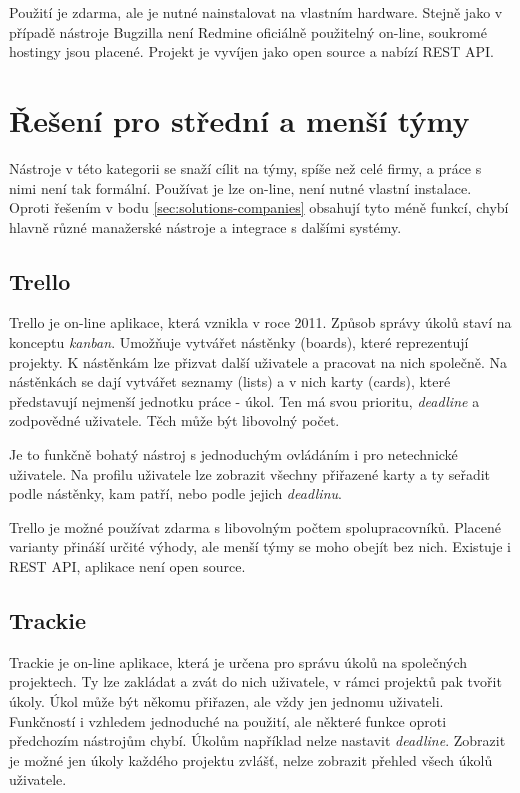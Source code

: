 \documentclass[thesis=B,czech]{FITthesis}[2012/06/26]
\begin{document}
			Použití je zdarma, ale je nutné nainstalovat na vlastním hardware. Stejně jako v případě nástroje Bugzilla není Redmine oficiálně použitelný on-line, soukromé hostingy jsou placené. Projekt je vyvíjen jako open source a nabízí REST API.

	\section{Řešení pro střední a menší týmy}
		\label{sec:solutions-teams}
		Nástroje v této kategorii se snaží cílit na týmy, spíše než celé firmy, a práce s nimi není tak formální. Používat je lze on-line, není nutné vlastní instalace. Oproti řešením v bodu \ref{sec:solutions-companies} obsahují tyto méně funkcí, chybí hlavně různé manažerské nástroje a integrace s dalšími systémy.
	
		\subsection{Trello}
			Trello \cite{trello} je on-line aplikace, která vznikla v roce 2011. Způsob správy úkolů staví na konceptu \textit{kanban}\cite{kanban}. Umožňuje vytvářet nástěnky (boards), které reprezentují projekty. K nástěnkám lze přizvat další uživatele a pracovat na nich společně. Na nástěnkách se dají vytvářet seznamy (lists) a v nich karty (cards), které představují nejmenší jednotku práce - úkol. Ten má svou prioritu, \textit{deadline} a zodpovědné uživatele. Těch může být libovolný počet.
			
			Je to funkčně bohatý nástroj s jednoduchým ovládáním i pro netechnické uživatele. Na profilu uživatele lze zobrazit všechny přiřazené karty a ty seřadit podle nástěnky, kam patří, nebo podle jejich \textit{deadlinu}. 
			
			Trello je možné používat zdarma s libovolným počtem spolupracovníků. Placené varianty přináší určité výhody\cite{trello-pricing}, ale menší týmy se moho obejít bez nich. Existuje i REST API\cite{trello-api}, aplikace není open source.
		
			
		\subsection{Trackie}
			Trackie \cite{trackie} je on-line aplikace, která je určena pro správu úkolů na společných projektech. Ty lze zakládat a zvát do nich uživatele, v rámci projektů pak tvořit úkoly. Úkol může být někomu přiřazen, ale vždy jen jednomu uživateli. Funkčností i vzhledem jednoduché na použití, ale některé funkce oproti předchozím nástrojům chybí. Úkolům například nelze nastavit \textit{deadline}. Zobrazit je možné jen úkoly každého projektu zvlášť, nelze zobrazit přehled všech úkolů uživatele. 
			
\end{document}
